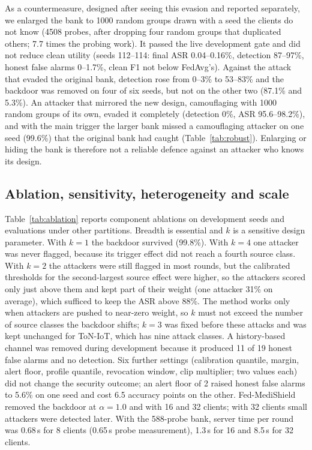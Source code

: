 \documentclass[conference]{IEEEtran}
\begin{document}
As a countermeasure, designed after seeing this evasion and reported separately, we enlarged the bank to 1000 random groups drawn with a seed the clients do not know (4508 probes, after dropping four random groups that duplicated others; 7.7 times the probing work). It passed the live development gate and did not reduce clean utility (seeds 112--114: final ASR 0.04--0.16\%, detection 87--97\%, honest false alarms 0--1.7\%, clean F1 not below FedAvg's). Against the attack that evaded the original bank, detection rose from 0--3\% to 53--83\% and the backdoor was removed on four of six seeds, but not on the other two (87.1\% and 5.3\%). An attacker that mirrored the new design, camouflaging with 1000 random groups of its own, evaded it completely (detection 0\%, ASR 95.6--98.2\%), and with the main trigger the larger bank missed a camouflaging attacker on one seed (99.6\%) that the original bank had caught (Table~\ref{tab:robust}). Enlarging or hiding the bank is therefore not a reliable defence against an attacker who knows its design.

\subsection{Ablation, sensitivity, heterogeneity and scale}
Table~\ref{tab:ablation} reports component ablations on development seeds and evaluations under other partitions. Breadth is essential and $k$ is a sensitive design parameter. With $k=1$ the backdoor survived (99.8\%). With $k=4$ one attacker was never flagged, because its trigger effect did not reach a fourth source class. With $k=2$ the attackers were still flagged in most rounds, but the calibrated thresholds for the second-largest source effect were higher, so the attackers scored only just above them and kept part of their weight (one attacker 31\% on average), which sufficed to keep the ASR above 88\%. The method works only when attackers are pushed to near-zero weight, so $k$ must not exceed the number of source classes the backdoor shifts; $k=3$ was fixed before these attacks and was kept unchanged for ToN-IoT, which has nine attack classes. A history-based channel was removed during development because it produced 11 of 19 honest false alarms and no detection. Six further settings (calibration quantile, margin, alert floor, profile quantile, revocation window, clip multiplier; two values each) did not change the security outcome; an alert floor of 2 raised honest false alarms to 5.6\% on one seed and cost 6.5 accuracy points on the other. Fed-MediShield removed the backdoor at $\alpha=1.0$ and with 16 and 32 clients; with 32 clients small attackers were detected later. With the 588-probe bank, server time per round was 0.68\,s for 8 clients (0.65\,s probe measurement), 1.3\,s for 16 and 8.5\,s for 32 clients.
\end{document}
